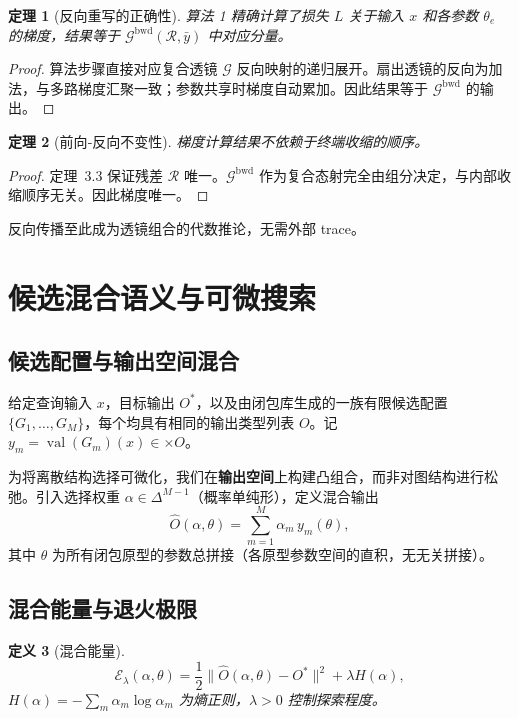 \documentclass{ctexart}
\newcommand{\bigtimes}{\times}
\newtheorem{theorem}{定理}[section]
\newtheorem{definition}[theorem]{定义}
\DeclareMathOperator{\val}{val}
\begin{document}
\begin{theorem}[反向重写的正确性]
算法 1 精确计算了损失 $L$ 关于输入 $x$ 和各参数 $\theta_e$ 的梯度，结果等于 $\mathcal{G}^{\mathrm{bwd}}(\mathcal{R}, \bar{y})$ 中对应分量。
\end{theorem}
\begin{proof}
算法步骤直接对应复合透镜 $\mathcal{G}$ 反向映射的递归展开。扇出透镜的反向为加法，与多路梯度汇聚一致；参数共享时梯度自动累加。因此结果等于 $\mathcal{G}^{\mathrm{bwd}}$ 的输出。
\end{proof}

\begin{theorem}[前向‑反向不变性]
梯度计算结果不依赖于终端收缩的顺序。
\end{theorem}
\begin{proof}
定理~3.3 保证残差 $\mathcal{R}$ 唯一。$\mathcal{G}^{\mathrm{bwd}}$ 作为复合态射完全由组分决定，与内部收缩顺序无关。因此梯度唯一。
\end{proof}

反向传播至此成为透镜组合的代数推论，无需外部 trace。

\section{候选混合语义与可微搜索}

\subsection{候选配置与输出空间混合}

给定查询输入 $x$，目标输出 $O^*$，以及由闭包库生成的一族有限候选配置 $\{G_1,\dots,G_M\}$，每个均具有相同的输出类型列表 $O$。记 $y_m = \val(G_m)(x) \in \bigtimes O$。

为将离散结构选择可微化，我们在\textbf{输出空间}上构建凸组合，而非对图结构进行松弛。引入选择权重 $\alpha \in \Delta^{M-1}$（概率单纯形），定义混合输出
\[
\widehat{O}(\alpha, \theta) = \sum_{m=1}^M \alpha_m \, y_m(\theta),
\]
其中 $\theta$ 为所有闭包原型的参数总拼接（各原型参数空间的直积，无无关拼接）。

\subsection{混合能量与退火极限}

\begin{definition}[混合能量]
\[
\mathcal{E}_\lambda(\alpha,\theta) = \frac12 \big\| \widehat{O}(\alpha,\theta) - O^* \big\|^2 + \lambda H(\alpha),
\]
$H(\alpha) = -\sum_m \alpha_m \log \alpha_m$ 为熵正则，$\lambda>0$ 控制探索程度。
\end{definition}
\end{document}
